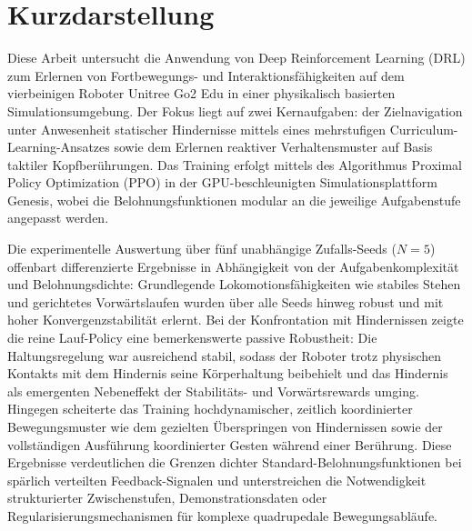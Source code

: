 \thispagestyle{empty}
\section*{Kurzdarstellung}
\label{sec:kurzdarstellung}
Diese Arbeit untersucht die Anwendung von Deep Reinforcement Learning (DRL) zum Erlernen von Fortbewegungs- und Interaktionsfähigkeiten auf dem vierbeinigen Roboter Unitree Go2 Edu in einer physikalisch basierten Simulationsumgebung. Der Fokus liegt auf zwei Kernaufgaben: der Zielnavigation unter Anwesenheit statischer Hindernisse mittels eines mehrstufigen Curriculum-Learning-Ansatzes sowie dem Erlernen reaktiver Verhaltensmuster auf Basis taktiler Kopfberührungen. Das Training erfolgt mittels des Algorithmus Proximal Policy Optimization (PPO) in der GPU-beschleunigten Simulationsplattform Genesis, wobei die Belohnungsfunktionen modular an die jeweilige Aufgabenstufe angepasst werden.

Die experimentelle Auswertung über fünf unabhängige Zufalls-Seeds ($N = 5$) offenbart differenzierte Ergebnisse in Abhängigkeit von der Aufgabenkomplexität und Belohnungsdichte: Grundlegende Lokomotionsfähigkeiten wie stabiles Stehen und gerichtetes Vorwärtslaufen wurden über alle Seeds hinweg robust und mit hoher Konvergenzstabilität erlernt. Bei der Konfrontation mit Hindernissen zeigte die reine Lauf-Policy eine bemerkenswerte passive Robustheit: Die Haltungsregelung war ausreichend stabil, sodass der Roboter trotz physischen Kontakts mit dem Hindernis seine Körperhaltung beibehielt und das Hindernis als emergenten Nebeneffekt der Stabilitäts- und Vorwärtsrewards umging. Hingegen scheiterte das Training hochdynamischer, zeitlich koordinierter Bewegungsmuster wie dem gezielten Überspringen von Hindernissen sowie der vollständigen Ausführung koordinierter Gesten während einer Berührung. Diese Ergebnisse verdeutlichen die Grenzen dichter Standard-Belohnungsfunktionen bei spärlich verteilten Feedback-Signalen und unterstreichen die Notwendigkeit strukturierter Zwischenstufen, Demonstrationsdaten oder Regularisierungsmechanismen für komplexe quadrupedale Bewegungsabläufe.
